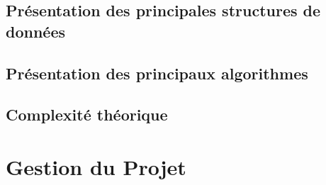 \documentclass{report}
\begin{document}
\section{Présentation des principales structures de données}
\section{Présentation des principaux algorithmes}%
\section{Complexité théorique}

\chapter{Gestion du Projet}
\end{document}
